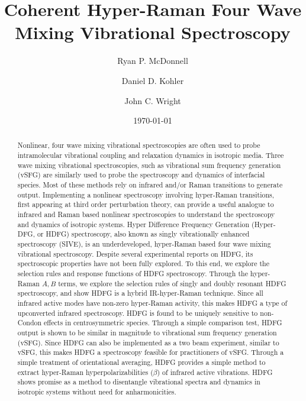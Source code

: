 \documentclass[aip, jcp, reprint, onecolumn]{revtex4-2}
\begin{document}
\title{Coherent Hyper-Raman Four Wave Mixing Vibrational Spectroscopy}


\author{Ryan P. McDonnell} 
\author{Daniel D. Kohler}
\author{John C. Wright} 


\date{\today}

\begin{abstract}
Nonlinear, four wave mixing vibrational spectroscopies are often used to probe intramolecular vibrational coupling and relaxation dynamics in isotropic media.
Three wave mixing vibrational spectroscopies, such as vibrational sum frequency generation (vSFG) are similarly used to probe the spectroscopy and dynamics of interfacial species.
Most of these methods rely on infrared and/or Raman transitions to generate output. 
Implementing a nonlinear spectroscopy involving hyper-Raman transitions, first appearing at third order perturbation theory, can provide a useful analogue to infrared and Raman based nonlinear spectroscopies to understand the spectroscopy and dynamics of isotropic systems.
Hyper Difference Frequency Generation (Hyper-DFG, or HDFG) spectroscopy, also known as singly vibrationally enhanced spectroscopy (SIVE), is an underdeveloped, hyper-Raman based four wave mixing vibrational spectroscopy. 
Despite several experimental reports on HDFG, its spectroscopic properties have not been fully explored.
To this end, we explore the selection rules and response functions of HDFG spectroscopy.
Through the hyper-Raman $A,B$ terms, we explore the selection rules of singly and doubly resonant HDFG spectroscopy, and show HDFG is a hybrid IR-hyper-Raman technique.
Since all infrared active modes have non-zero hyper-Raman activity, this makes HDFG a type of upconverted infrared spectroscopy.
HDFG is found to be uniquely sensitive to non-Condon effects in centrosymmetric species.
Through a simple comparison test, HDFG output is shown to be similar in magnitude to vibrational sum frequency generation (vSFG).
Since HDFG can also be implemented as a two beam experiment, similar to vSFG, this makes HDFG a spectroscopy feasible for practitioners of vSFG.
Through a simple treatment of orientational averaging, HDFG provides a simple method to extract hyper-Raman hyperpolarizabilities ($\beta$) of infrared active vibrations.
HDFG shows promise as a method to disentangle vibrational spectra and dynamics in isotropic systems without need for anharmonicities.

\end{abstract}
\end{document}
